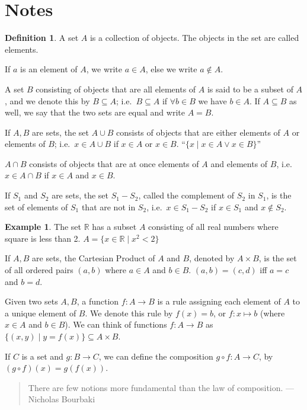 \documentclass[12pt,letterpaper,DIV=11,final]{scrartcl}
\theoremstyle{plain}
\theoremstyle{definition}
\newtheorem{definition}{Definition}[section]
\newtheorem{example}{Example}[section]
\theoremstyle{remark}
\begin{document}
\part*{Notes}
\begin{definition}
  A set $A$ is a collection of objects.
  The objects in the set are called elements.
\end{definition}

If $a$ is an element of $A$, we write $a \in A$, else we write $a \not\in A$.

A set $B$ consisting of objects that are all elements of $A$ is said to be a subset of $A$, and we denote this by $B \subseteq A$; i.e.\ $B \subseteq A$ if $\forall b \in B$ we have $b \in A$.
If $A \subseteq B$ as well, we say that the two sets are equal and write $A = B$.

If $A, B$ are sets, the set $A \cup B$ consists of objects that are either elements of $A$ or elements of $B$; i.e.\ $x \in A \cup B$ if $x \in A$ or $x \in B$. \enquote{$\{ x \mid x \in A \lor x \in B\}$}

$A \cap B$ consists of objects that are at once elements of $A$ and elements of $B$, i.e.\ $x \in A \cap B$ if $x \in A$ and $x \in B$.

If $S_1$ and $S_2$ are sets, the set $S_1 - S_2$, called the complement of $S_2$ in $S_1$, is the set of elements of $S_1$ that are not in $S_2$, i.e.\ $x \in S_1 - S_2$ if $x \in S_1$ and $x \not\in S_2$.

\begin{example}
  The set $\mathbb{R}$ has a subset $A$ consisting of all real numbers where square is less than 2.
  $A = \{ x \in \mathbb{R} \mid x^2 < 2\}$
\end{example}

If $A, B$ are sets, the Cartesian Product of $A$ and $B$, denoted by $A \times B$, is the set of all ordered pairs $(a, b)$ where $a \in A$ and $b \in B$. $(a, b) = (c, d)$ iff $a = c$ and $b = d$.

Given two sets $A, B$, a function $f: A \to B$ is a rule assigning each element of $A$ to a unique element of $B$.
We denote this rule by $f(x) = b$, or $f: x \mapsto b$ (where $x \in A$ and $b \in B$).
We can think of functions $f: A \to B$ as $\{(x, y) \mid y = f(x)\} \subseteq A \times B$.

If $C$ is a set and $g: B \to C$, we can define the composition $g \circ f: A \to C$, by $(g \circ f)(x) = g(f(x))$.

\begin{quote}
  There are few notions more fundamental than the law of composition. --- Nicholas Bourbaki
\end{quote}
\end{document}
